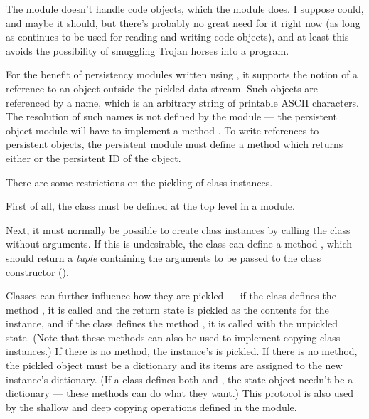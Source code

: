 The  module doesn't handle code objects, which the
 module does.  I suppose  could, and maybe
it should, but there's probably no great need for it right now (as
long as  continues to be used for reading and writing
code objects), and at least this avoids the possibility of smuggling
Trojan horses into a program.

For the benefit of persistency modules written using , it
supports the notion of a reference to an object outside the pickled
data stream.  Such objects are referenced by a name, which is an
arbitrary string of printable ASCII characters.  The resolution of
such names is not defined by the  module --- the
persistent object module will have to implement a method
.  To write references to persistent objects,
the persistent module must define a method  which
returns either  or the persistent ID of the object.

There are some restrictions on the pickling of class instances.

First of all, the class must be defined at the top level in a module.

Next, it must normally be possible to create class instances by
calling the class without arguments.  If this is undesirable, the
class can define a method , which should
return a {\em tuple} containing the arguments to be passed to the
class constructor ().

Classes can further influence how they are pickled --- if the class
defines the method , it is called and the return
state is pickled as the contents for the instance, and if the class
defines the method , it is called with the
unpickled state.  (Note that these methods can also be used to
implement copying class instances.)  If there is no
 method, the instance's  is
pickled.  If there is no  method, the pickled
object must be a dictionary and its items are assigned to the new
instance's dictionary.  (If a class defines both 
and , the state object needn't be a dictionary
--- these methods can do what they want.)  This protocol is also used
by the shallow and deep copying operations defined in the 
module.

